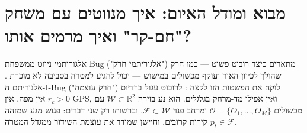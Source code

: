 \documentclass[11pt, a4paper]{article}
\begin{document}
\section{מבוא ומודל האיום: איך מנווטים עם משחק "חם-קר" ואיך מרמים אותו?}
אלגוריתמי ניווט ממשפחת \foreignlanguage{english}{Bug} ("אלגוריתמי חרק") מתארים כיצד רובוט פשוט — כמו חרק שהולך לכיוון האור ועוקף מכשולים במישוש — יכול להגיע למטרה בסביבה לא מוכרת \cite{lumelsky1987path, kamon1998tangentbug}. אלגוריתם ה-\foreignlanguage{english}{I-Bug} ("חרק עוצמה") לוקח את הפשטות הזו לקצה \cite{taylor2009ibug, taylor2014intensity}: לרובוט עגול ברדיוס $r_c > 0$ אין מפה, אין \foreignlanguage{english}{GPS}, ואין אפילו מד-מרחק בגלגלים. הוא נע בזירה $\mathcal{W} \subset \mathbb{R}^2$ עם מכשולים $\mathcal{O} = \{O_1, \dots, O_M\}$ ומרחב פנוי $\mathcal{F} \subset \mathcal{W}$, וברשותו רק שני דברים: פגוש מגע שמזהה קירות קרובים, וחיישן שמודד את עוצמת השידור ממגדל המטרה $p_t \in \mathcal{F}$.
\end{document}
